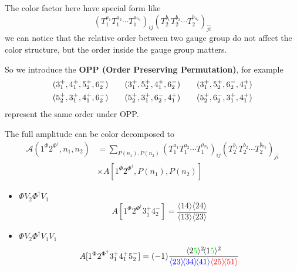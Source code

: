 \documentclass{beamer}
\newcommand{\avg}[1]{\langle #1 \rangle}
\newcommand{\mdavg}[2]{\langle #1 \rangle\!\langle #2 \rangle}
\begin{document}
\begin{frame}
\begin{center}
\begin{tikzpicture}[x=0.75pt,y=0.75pt,yscale=0.8,xscale=0.8]
        \end{tikzpicture}
    \end{center}
    The color factor here have special form like
    \begin{equation*}
         (T_1^{a_1}T_1^{a_2}\cdots T_1^{a_{n_1}})_{ij}(T_2^{b_1}T_2^{b_2}\cdots T_2^{b_{n_2}})_{\bar{j}\bar{i}}
    \end{equation*}
     we can notice that the relative order between two gauge group do not affect the color structure, but the
    order inside the gauge group matters.
\end{frame}

\begin{frame}
    So we introduce the \textbf{OPP (Order Preserving Permutation)}, for example 
    \begin{gather*}
        (3_1^+,4_1^+,5_2^+,6_2^-)\qquad(3_1^+,5_2^+,4_1^+,6_2^-)\qquad (3_1^+,5_2^+,6_2^-,4_1^+)\notag\\
        (5_2^+,3_1^+,4_1^+,6_2^-)\qquad(5_2^+,3_1^+,6_2^-,4_1^+)\qquad (5_2^+,6_2^-,3_1^+,4_1^+)
    \end{gather*}
    represent the same order under OPP.

    The full amplitude can be color decomposed to 
    \begin{align*}
        \mathcal{A}(1^\Phi2^{\Phi^\dagger},n_1,n_2)&=\sum_{P(n_1),P(n_2)}(T_1^{a_1}T_1^{a_2}\cdots T_1^{a_{n_1}})_{ij}(T_2^{b_1}T_2^{b_2}\cdots T_2^{b_{n_2}})_{\bar{j}\bar{i}}\\
        &\times A[1^\Phi2^{\Phi^\dagger},P(n_1),P(n_2)]
    \end{align*}
    \begin{itemize}
        \item $\Phi V_2 \Phi^\dagger V_1$
        \begin{equation*}
            A[1^\Phi2^{\Phi^\dagger}3_1^+4_2^-]=\frac{\mdavg{14}{24}}{\mdavg{13}{23}}
        \end{equation*}
        \item $\Phi V_2 \Phi^\dagger V_1V_1$
        \begin{equation*}
            A[1^\Phi2^{\Phi^\dagger}3_1^+4_1^+5_2^-]=(-1)\frac{\avg{2\textcolor{green}{5}}^2\!\avg{1\textcolor{green}{5}}^2}{\textcolor{blue}{\mdavg{23}{34}\!\avg{41}}\textcolor{red}{\mdavg{25}{51}}}
        \end{equation*}  
    \end{itemize}
\end{frame}
\end{document}
